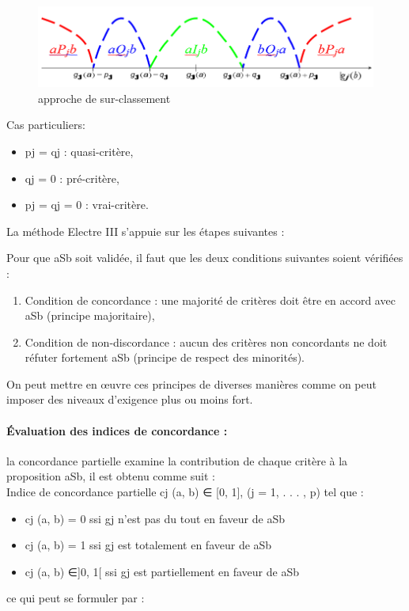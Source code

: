 \begin{figure}[!h]
\begin{center}
\includegraphics{aide_multicrit_decision/intervales_pref_inconp_indif.png}
\end{center}
\caption{approche de sur-classement}
\end{figure}

Cas particuliers:
\begin{itemize}
\item pj  = qj : quasi-critère,
\item qj  = 0 :	pré-critère,
\item pj  = qj  = 0 : vrai-critère.
\end{itemize}

La méthode Electre III s’appuie sur les étapes  suivantes :

Pour que aSb soit validée, il faut que les deux conditions suivantes soient vérifiées :
\begin{enumerate}
\item Condition  de concordance : une majorité de critères doit être en accord avec aSb (principe majoritaire),
\item Condition de non-discordance : aucun des critères non concordants ne doit réfuter fortement aSb (principe de respect des minorités).
\end{enumerate}
On peut mettre en œuvre ces principes de diverses manières comme on peut  imposer des niveaux d’exigence plus ou moins fort.

\paragraph{Évaluation des indices de concordance :}

la concordance partielle examine la contribution de chaque critère à la proposition aSb, il est obtenu comme suit :\\
Indice de concordance partielle cj (a, b) ∈ [0, 1], (j = 1, . . . , p) tel que :
\begin{itemize}
\item cj (a, b) = 0 ssi gj n’est pas du tout en faveur de aSb
\item cj (a, b) = 1 ssi gj est totalement en faveur de aSb
\item cj (a, b) ∈]0, 1[ ssi gj est partiellement en faveur de aSb
\end{itemize}
	ce qui peut se formuler par :
                      
